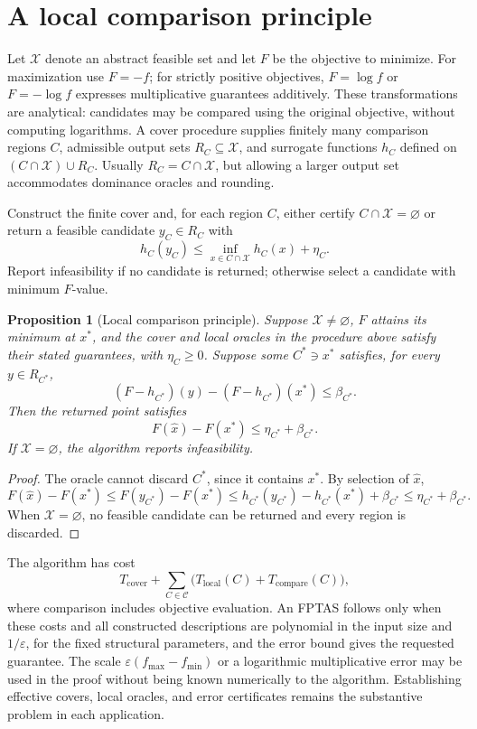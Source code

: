 \documentclass[11pt]{article}
\newtheorem{proposition}[theorem]{Proposition}
\theoremstyle{definition}\newtheorem{definition}{Definition}[section]
\theoremstyle{remark}\newtheorem{remark}[theorem]{Remark}
\newcommand{\eps}{\varepsilon}
\begin{document}
\appendix
\section{A local comparison principle}\label{app:comparison}
Let $\mathcal X$ denote an abstract feasible set and let $F$ be the objective to minimize. For maximization use $F=-f$; for strictly positive objectives, $F=\log f$ or $F=-\log f$ expresses multiplicative guarantees additively. These transformations are analytical: candidates may be compared using the original objective, without computing logarithms. A cover procedure supplies finitely many comparison regions $C$, admissible output sets $R_C\subseteq\mathcal X$, and surrogate functions $h_C$ defined on $(C\cap\mathcal X)\cup R_C$. Usually $R_C=C\cap\mathcal X$, but allowing a larger output set accommodates dominance oracles and rounding.

Construct the finite cover and, for each region $C$, either certify $C\cap\mathcal X=\varnothing$ or return a feasible candidate $y_C\in R_C$ with
\[
 h_C(y_C)\le\inf_{x\in C\cap\mathcal X}h_C(x)+\eta_C.
\]
Report infeasibility if no candidate is returned; otherwise select a candidate with minimum $F$-value.


\begin{proposition}[Local comparison principle]\label{prop:local-comparison}
Suppose $\mathcal X\ne\varnothing$, $F$ attains its minimum at $x^*$, and the cover and local oracles in the procedure above satisfy their stated guarantees, with $\eta_C\ge0$. Suppose some $C^*\ni x^*$ satisfies, for every $y\in R_{C^*}$,
\[
 (F-h_{C^*})(y)-(F-h_{C^*})(x^*)\le\beta_{C^*}.
\]
Then the returned point satisfies
\[
 F(\widehat x)-F(x^*)\le\eta_{C^*}+\beta_{C^*}.
\]
If $\mathcal X=\varnothing$, the algorithm reports infeasibility.
\end{proposition}
\begin{proof}
The oracle cannot discard $C^*$, since it contains $x^*$. By selection of $\widehat x$,
\[
 F(\widehat x)-F(x^*)
 \le F(y_{C^*})-F(x^*)
 \le h_{C^*}(y_{C^*})-h_{C^*}(x^*)+\beta_{C^*}
 \le\eta_{C^*}+\beta_{C^*}.
\]
When $\mathcal X=\varnothing$, no feasible candidate can be returned and every region is discarded.
\end{proof}

The algorithm has cost
\[
 T_{\mathrm{cover}}+\sum_{C\in\mathcal C}
 \bigl(T_{\mathrm{local}}(C)+T_{\mathrm{compare}}(C)\bigr),
\]
where comparison includes objective evaluation. An FPTAS follows only when these costs and all constructed descriptions are polynomial in the input size and $1/\eps$, for the fixed structural parameters, and the error bound gives the requested guarantee. The scale $\eps(f_{\max}-f_{\min})$ or a logarithmic multiplicative error may be used in the proof without being known numerically to the algorithm. Establishing effective covers, local oracles, and error certificates remains the substantive problem in each application.
\end{document}
